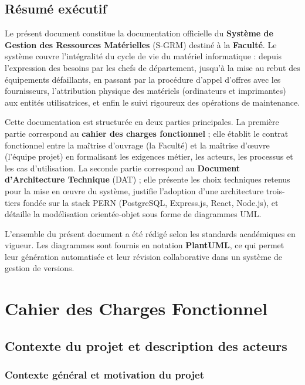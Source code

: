 \documentclass[a4paper,11pt,openany]{report}
\begin{document}
\chapter*{Résumé exécutif}

Le présent document constitue la documentation officielle du
\textbf{Système de Gestion des Ressources Matérielles} (S-GRM)
destiné à la \textbf{Faculté}. Le système couvre l'intégralité du
cycle de vie du matériel informatique : depuis l'expression
des besoins par les chefs de département, jusqu'à la mise au rebut
des équipements défaillants, en passant par la procédure d'appel
d'offres avec les fournisseurs, l'attribution physique des
matériels (ordinateurs et imprimantes) aux entités utilisatrices,
et enfin le suivi rigoureux des opérations de maintenance.

Cette documentation est structurée en deux parties principales.
La première partie correspond au \textbf{cahier des charges
fonctionnel} ; elle établit le contrat fonctionnel entre la
maîtrise d'ouvrage (la Faculté) et la maîtrise d'œuvre (l'équipe
projet) en formalisant les exigences métier, les acteurs, les
processus et les cas d'utilisation. La seconde partie correspond
au \textbf{Document d'Architecture Technique} (DAT) ; elle
présente les choix techniques retenus pour la mise en œuvre du
système, justifie l'adoption d'une architecture trois-tiers
fondée sur la stack \textsc{PERN} (PostgreSQL, Express.js, React,
Node.js), et détaille la modélisation orientée-objet sous forme de
diagrammes UML.

L'ensemble du présent document a été rédigé selon les standards
académiques en vigueur. Les diagrammes sont fournis en notation
\textbf{PlantUML}, ce qui permet leur génération automatisée et
leur révision collaborative dans un système de gestion de versions.

\part{Cahier des Charges Fonctionnel}

\chapter{Contexte du projet et description des acteurs}

\section{Contexte général et motivation du projet}
\end{document}
